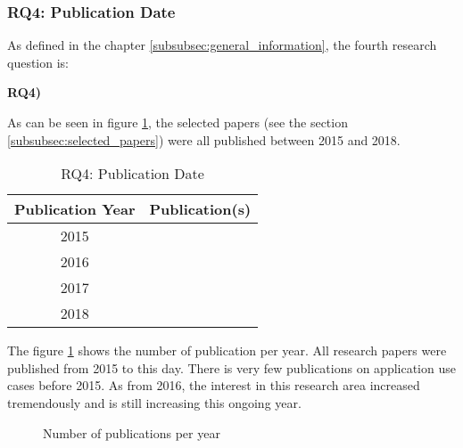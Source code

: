 
\clearpage
\subsubsection{RQ4: Publication Date}
\label{subsubsec:rq4_publication_date}
As defined in the chapter \ref{subsubsec:general_information}, the fourth research question is:
\begin{displayquote}
\textbf{RQ4) }
\end{displayquote}
As can be seen in figure \ref{tab:rq4_publication_date}, the selected papers (see the section \ref{subsubsec:selected_papers}) were all published between 2015 and 2018. \\
\begin{longtable}{ |c|c| }
	\caption{RQ4: Publication Date} \label{tab:rq4_publication_date} \\
	\hline
 	Publication Year & Publication(s) \\ [0.5ex] 
 	\hline\hline
 		2015  & \cite{2015_Dennis,2015_Zyskind} \\ 
	 \hline
	 2016 & \cite{2016_Azaria,2016_Bahga,2016_Jacynycz,2016_Kianmajd,2016_Schaub,2016_Sharples,2016_Tian,2016_Yasin,2016_Yue} \\  
	 \hline
	 2017 & \cite{2017_Coyne,2017_Gipp,2017_Jaag,2017_Liu,2017_Madhwal,2017_Naerland,2017_Ouaddah,2017_Tackmann} \\
	 \hline
	 2018 & \cite{2018_Alessandra,2018_Lucena} \\
	 \hline
\end{longtable}
The figure \ref{fig:rq4_publication_date} shows the number of publication per year. All research papers were published from 2015 to this day. There is very few publications on application use cases before 2015. As from 2016, the interest in this research area increased tremendously and is still increasing this ongoing year.
\begin{figure}[!ht]
	\centering
	\caption{Number of publications per year} 
	\label{fig:rq4_publication_date}
\end{figure}


\clearpage
